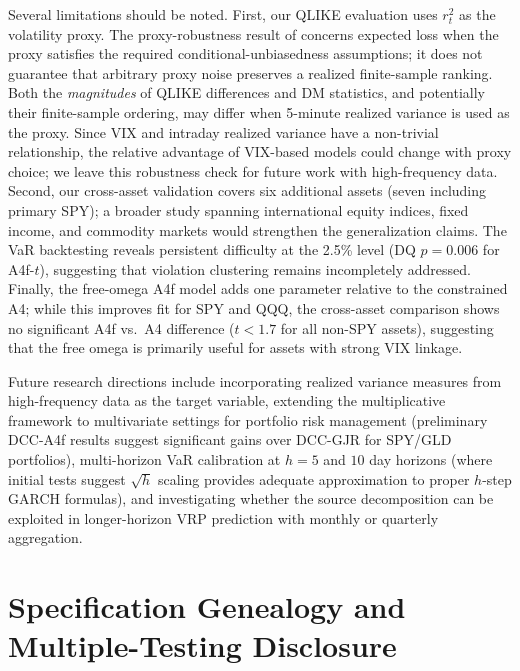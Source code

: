 \documentclass[12pt,a4paper]{article}
\begin{document}
Several limitations should be noted. First, our QLIKE evaluation uses $r_t^2$ as the volatility proxy. The proxy-robustness result of \citet{patton2011} concerns expected loss when the proxy satisfies the required conditional-unbiasedness assumptions; it does not guarantee that arbitrary proxy noise preserves a realized finite-sample ranking. Both the \emph{magnitudes} of QLIKE differences and DM statistics, and potentially their finite-sample ordering, may differ when 5-minute realized variance is used as the proxy. Since VIX and intraday realized variance have a non-trivial relationship, the relative advantage of VIX-based models could change with proxy choice; we leave this robustness check for future work with high-frequency data. Second, our cross-asset validation covers six additional assets (seven including primary SPY); a broader study spanning international equity indices, fixed income, and commodity markets would strengthen the generalization claims. The VaR backtesting reveals persistent difficulty at the 2.5\% level (DQ $p = 0.006$ for A4f-$t$), suggesting that violation clustering remains incompletely addressed. Finally, the free-omega A4f model adds one parameter relative to the constrained A4; while this improves fit for SPY and QQQ, the cross-asset comparison shows no significant A4f vs.\ A4 difference ($t < 1.7$ for all non-SPY assets), suggesting that the free omega is primarily useful for assets with strong VIX linkage.

Future research directions include incorporating realized variance measures from high-frequency data as the target variable, extending the multiplicative framework to multivariate settings for portfolio risk management (preliminary DCC-A4f results suggest significant gains over DCC-GJR for SPY/GLD portfolios), multi-horizon VaR calibration at $h = 5$ and $10$ day horizons (where initial tests suggest $\sqrt{h}$ scaling provides adequate approximation to proper $h$-step GARCH formulas), and investigating whether the source decomposition can be exploited in longer-horizon VRP prediction with monthly or quarterly aggregation.


\appendix
\section{Specification Genealogy and Multiple-Testing Disclosure}
\label{app:spec_genealogy}
\end{document}

